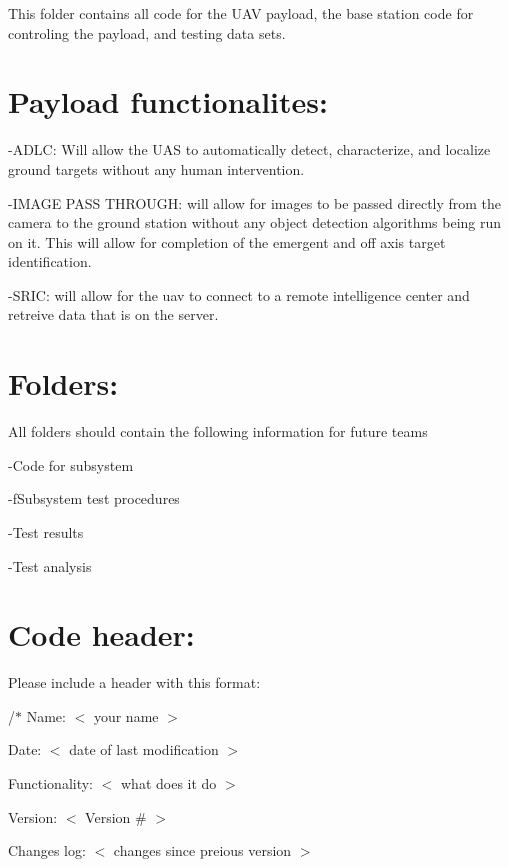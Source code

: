 This folder contains all code for the U\-A\-V payload, the base station code for controling the payload, and testing data sets.

\section*{Payload functionalites\-: }

-\/\-A\-D\-L\-C\-: Will allow the U\-A\-S to automatically detect, characterize, and localize ground targets without any human intervention.

-\/\-I\-M\-A\-G\-E P\-A\-S\-S T\-H\-R\-O\-U\-G\-H\-: will allow for images to be passed directly from the camera to the ground station without any object detection algorithms being run on it. This will allow for completion of the emergent and off axis target identification.

-\/\-S\-R\-I\-C\-: will allow for the uav to connect to a remote intelligence center and retreive data that is on the server.

\section*{Folders\-: }

All folders should contain the following information for future teams

-\/\-Code for subsystem

-\/f\-Subsystem test procedures

-\/\-Test results

-\/\-Test analysis

\section*{Code header\-: }

Please include a header with this format\-:

/$\ast$ Name\-: $<$ your name $>$

Date\-: $<$ date of last modification $>$

Functionality\-: $<$ what does it do $>$

Version\-: $<$ Version \# $>$

Changes log\-: $<$ changes since preious version $>$ 